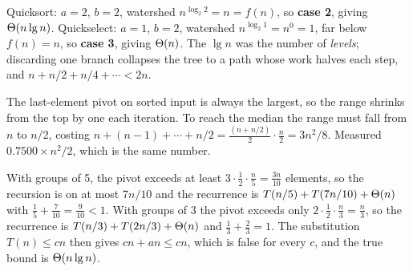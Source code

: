 \begin{ans}
  \item Quicksort: $a = 2$, $b = 2$, watershed $n^{\log_{2}2} = n = f(n)$, so
        \textbf{case 2}, giving $\Theta(n\operatorname{lg} n)$. Quickselect: $a = 1$,
        $b = 2$, watershed $n^{\log_{2}1} = n^{0} = 1$, far below $f(n) = n$,
        so \textbf{case 3}, giving $\Theta(n)$. The $\lg n$ was the number of
        \emph{levels}; discarding one branch collapses the tree to a path whose
        work halves each step, and $n + n/2 + n/4 + \cdots < 2n$.
  \item The last-element pivot on sorted input is always the largest, so the
        range shrinks from the top by one each iteration. To reach the median
        the range must fall from $n$ to $n/2$, costing
        $n + (n-1) + \cdots + n/2 = \frac{(n + n/2)}{2}\cdot\frac{n}{2}
        = 3n^{2}/8$. Measured $0.7500 \times n^{2}/2$, which is the same
        number.
  \item With groups of 5, the pivot exceeds at least $3 \cdot \tfrac12 \cdot
        \tfrac{n}{5} = \tfrac{3n}{10}$ elements, so the recursion is on at most
        $7n/10$ and the recurrence is $T(n/5) + T(7n/10) + \Theta(n)$ with
        $\tfrac15 + \tfrac{7}{10} = \tfrac{9}{10} < 1$. With groups of 3 the
        pivot exceeds only $2\cdot\tfrac12\cdot\tfrac{n}{3} = \tfrac{n}{3}$, so
        the recurrence is $T(n/3) + T(2n/3) + \Theta(n)$ and
        $\tfrac13 + \tfrac23 = 1$. The substitution $T(n) \le cn$ then gives
        $cn + an \le cn$, which is false for every $c$, and the true bound is
        $\Theta(n\operatorname{lg} n)$.
\end{ans}

